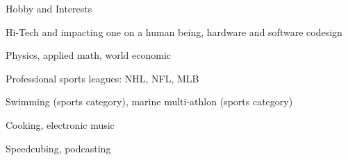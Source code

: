 \documentclass{template}
\begin{document}
\begin{rSection}{Hobby and Interests}
\begin{rHobby}

\item Hi-Tech and impacting one on a human being, hardware and software codesign
\item Physics, applied math, world economic
\item Professional sports leagues: NHL, NFL, MLB
\item Swimming (sports category), marine multi-athlon (sports category)
\item Cooking, electronic music
\item Speedcubing, podcasting

\end{rHobby}
\end{rSection}
\end{document}
